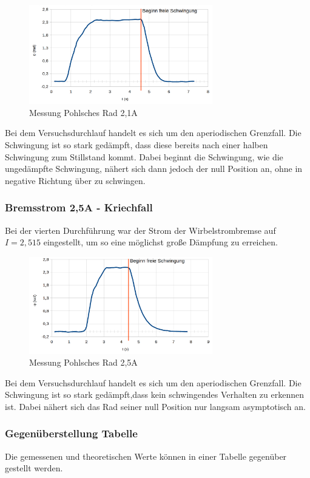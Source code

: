 \documentclass[a4paper]{scrartcl}
\numberwithin{equation}{subsection}
\begin{document}
\begin{figure}[H]
\includegraphics[width=8cm]{Messung_Rad_graph_21A}
\centering
\caption{Messung Pohlsches Rad 2,1A}
\centering
\end{figure}

Bei dem Versuchsdurchlauf handelt es sich um den aperiodischen Grenzfall. Die Schwingung ist so stark gedämpft, dass diese bereits nach einer halben Schwingung zum Stillstand kommt. Dabei beginnt die Schwingung, wie die ungedämpfte Schwingung, nähert sich dann jedoch der null Position an, ohne in negative Richtung über zu schwingen. 

\subsubsection{Bremsstrom 2,5A - Kriechfall}
Bei der vierten Durchführung war der Strom der Wirbelstrombremse auf $I = 2,515$ eingestellt, um so eine möglichst große Dämpfung zu erreichen.

\begin{figure}[H]
\includegraphics[width=8cm]{Messung_Rad_graph_25A}
\centering
\caption{Messung Pohlsches Rad 2,5A}
\centering
\end{figure}

Bei dem Versuchsdurchlauf handelt es sich um den aperiodischen Grenzfall. Die Schwingung ist so stark gedämpft,dass kein schwingendes Verhalten zu erkennen ist. Dabei nähert sich das Rad seiner null Position nur langsam asymptotisch an. 

\subsubsection{Gegenüberstellung Tabelle}
Die gemessenen und theoretischen Werte können in einer Tabelle gegenüber gestellt werden.
\end{document}
